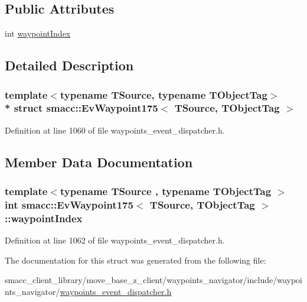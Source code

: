 \subsection*{Public Attributes}
\begin{DoxyCompactItemize}
\item 
int \hyperlink{structsmacc_1_1EvWaypoint175_add78cbc596c87089d086dfe0bc053e37}{waypoint\+Index}
\end{DoxyCompactItemize}


\subsection{Detailed Description}
\subsubsection*{template$<$typename T\+Source, typename T\+Object\+Tag$>$\\*
struct smacc\+::\+Ev\+Waypoint175$<$ T\+Source, T\+Object\+Tag $>$}



Definition at line 1060 of file waypoints\+\_\+event\+\_\+dispatcher.\+h.



\subsection{Member Data Documentation}
\subsubsection[{\texorpdfstring{waypoint\+Index}{waypointIndex}}]{\setlength{\rightskip}{0pt plus 5cm}template$<$typename T\+Source , typename T\+Object\+Tag $>$ int {\bf smacc\+::\+Ev\+Waypoint175}$<$ T\+Source, T\+Object\+Tag $>$\+::waypoint\+Index}\hypertarget{structsmacc_1_1EvWaypoint175_add78cbc596c87089d086dfe0bc053e37}{}\label{structsmacc_1_1EvWaypoint175_add78cbc596c87089d086dfe0bc053e37}


Definition at line 1062 of file waypoints\+\_\+event\+\_\+dispatcher.\+h.



The documentation for this struct was generated from the following file\+:\begin{DoxyCompactItemize}
\item 
smacc\+\_\+client\+\_\+library/move\+\_\+base\+\_\+z\+\_\+client/waypoints\+\_\+navigator/include/waypoints\+\_\+navigator/\hyperlink{waypoints__event__dispatcher_8h}{waypoints\+\_\+event\+\_\+dispatcher.\+h}\end{DoxyCompactItemize}
